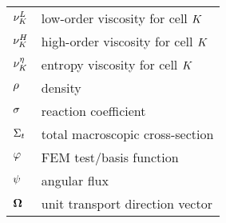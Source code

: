 \begin{center}
\begin{longtable}{l p{4.8in}}
$\lowordercellviscosity$  & low-order viscosity for cell $K$\\
$\highordercellviscosity$ & high-order viscosity for cell $K$\\
$\entropycellviscosity$   & entropy viscosity for cell $K$\\
$\rho$         & density\\
$\sigma$    & reaction coefficient\\
$\Sigma_t$ & total macroscopic cross-section\\
$\varphi$    & FEM test/basis function\\
$\psi$     & angular flux\\
$\mathbf{\Omega}$ & unit transport direction vector\\
\end{longtable}
\end{center}

\pagebreak{}
